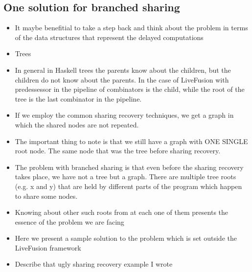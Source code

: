 \documentclass[preamble.tex]{subfiles}
\begin{document}
\subsection{One solution for branched sharing}
\begin{itemize}
\item It maybe benefitial to take a step back and think about the problem in terms of the data structures that represent the delayed computations
\item Trees
\item In general in Haskell trees the parents know about the children, but the children do not know about the parents. In the case of LiveFusion with predessessor in the pipeline of combinators is the child, while the root of the tree is the last combinator in the pipeline.
\item If we employ the common sharing recovery techniques, we get a graph in which the shared nodes are not repeated.
\item The important thing to note is that we still have a graph with ONE SINGLE root node. The same node that was the tree before sharing recovery.
\item The problem with branched sharing is that even before the sharing recovery takes place, we have not a tree but a graph. There are multiple tree roots (e.g. x and y) that are held by different parts of the program which happen to share some nodes.
\item Knowing about other such roots from at each one of them presents the essence of the problem we are facing
\item Here we present a sample solution to the problem which is set outside the LiveFusion framework
\item Describe that ugly sharing recovery example I wrote
\end{itemize}
\end{document}

